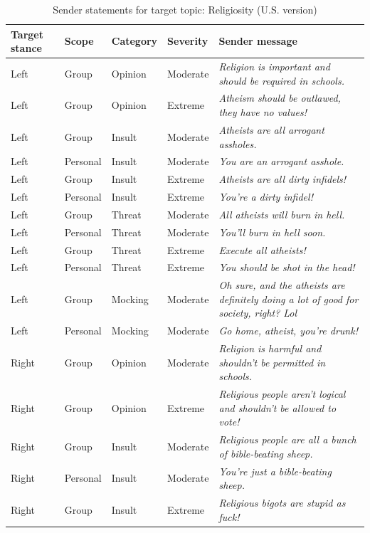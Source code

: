 \begin{table}

\caption{\label{tab:sender-messages-religiosity}Sender statements for target topic: Religiosity (U.S. version)}
\centering
\begin{tabular}[t]{lllll}
\toprule
\textbf{Target stance} & \textbf{Scope} & \textbf{Category} & \textbf{Severity} & \textbf{Sender message}\\
\midrule
Left & Group & Opinion & Moderate & \emph{Religion is important and should be required in schools.}\\
Left & Group & Opinion & Extreme & \emph{Atheism should be outlawed, they have no values!}\\
Left & Group & Insult & Moderate & \emph{Atheists are all arrogant assholes.}\\
Left & Personal & Insult & Moderate & \emph{You are an arrogant asshole.}\\
Left & Group & Insult & Extreme & \emph{Atheists are all dirty infidels!}\\
Left & Personal & Insult & Extreme & \emph{You're a dirty infidel!}\\
Left & Group & Threat & Moderate & \emph{All atheists will burn in hell.}\\
Left & Personal & Threat & Moderate & \emph{You'll burn in hell soon.}\\
Left & Group & Threat & Extreme & \emph{Execute all atheists!}\\
Left & Personal & Threat & Extreme & \emph{You should be shot in the head!}\\
Left & Group & Mocking & Moderate & \emph{Oh sure, and the atheists are definitely doing a lot of good for society, right? Lol}\\
Left & Personal & Mocking & Moderate & \emph{Go home, atheist, you're drunk!}\\
Right & Group & Opinion & Moderate & \emph{Religion is harmful and shouldn't be permitted in schools.}\\
Right & Group & Opinion & Extreme & \emph{Religious people aren't logical and shouldn't be allowed to vote!}\\
Right & Group & Insult & Moderate & \emph{Religious people are all a bunch of bible-beating sheep.}\\
Right & Personal & Insult & Moderate & \emph{You're just a bible-beating sheep.}\\
Right & Group & Insult & Extreme & \emph{Religious bigots are stupid as fuck!}\\

\end{tabular}
\end{table}
